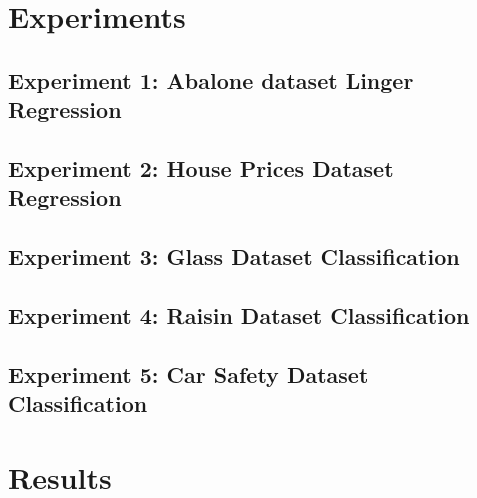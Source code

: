\documentclass[a4paper, 12pt]{report}
\begin{document}
\chapter{Experiments}
\label{ch:Experimnents}

\section{Experiment 1: Abalone dataset Linger Regression}

\section{Experiment 2: House Prices Dataset Regression}

\section{Experiment 3: Glass Dataset Classification}

\section{Experiment 4: Raisin Dataset Classification}

\section{Experiment 5: Car Safety Dataset Classification}

\chapter{Results}
\label{ch:Results}


\end{document}
